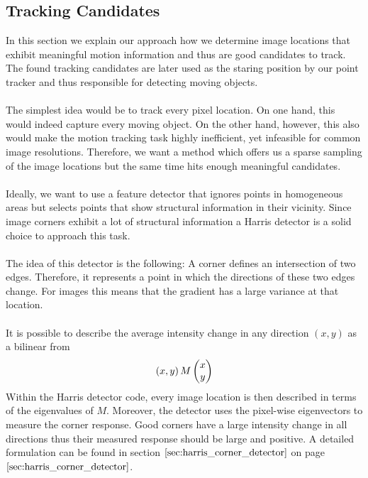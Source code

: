 \subsection{Tracking Candidates}
In this section we explain our approach how we determine image locations that exhibit meaningful motion information and thus are good candidates to track. The found tracking candidates are later used as the staring position by our point tracker and thus responsible for detecting moving objects. \\ \\
The simplest idea would be to track every pixel location. On one hand, this would indeed capture every moving object. On the other hand, however, this also would make the motion tracking task highly inefficient, yet infeasible for common image resolutions. Therefore, we want a method which offers us a sparse sampling of the image locations but the same time hits enough meaningful candidates. \\ \\
Ideally, we want to use a feature detector that ignores points in homogeneous areas but selects points that show structural information in their vicinity. Since image corners exhibit a lot of structural information a Harris detector is a solid choice to approach this task. \\ \\
The idea of this detector is the following: A corner defines an intersection of two edges. Therefore, it represents a point in which the directions of these two edges change. For images this means that the gradient has a large variance at that location. \\ \\
It is possible to describe the average intensity change in any direction $(x,y)$
as a bilinear from
\begin{equation}
\left( x,y \right) M \colvec{x}{y}	
\end{equation}
Within the Harris detector code, every image location is then described in terms of the eigenvalues of $M$. Moreover, the detector uses the pixel-wise eigenvectors to measure the corner response. Good corners have a large intensity change in all directions thus their measured response should be large and positive. A detailed formulation can be found in section $\ref{sec:harris_corner_detector}$ on page $\pageref{sec:harris_corner_detector}$. \\ \\
